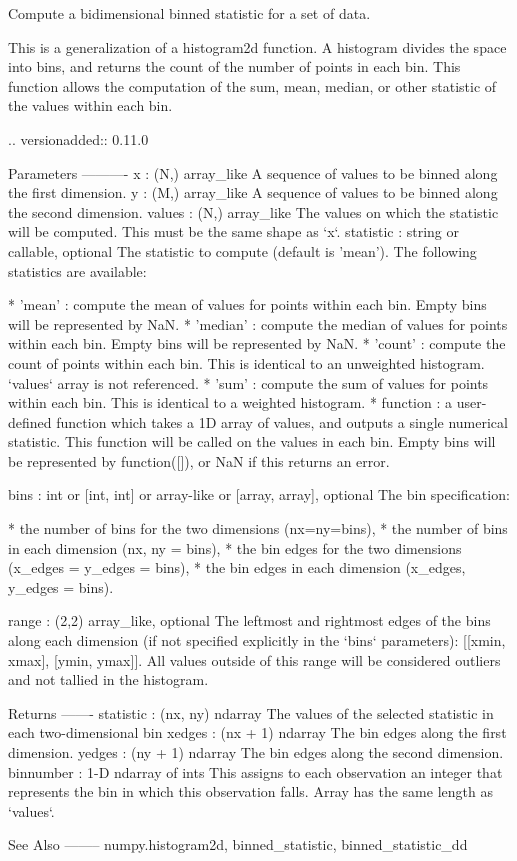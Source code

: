 \begin{DoxyVerb}Compute a bidimensional binned statistic for a set of data.

This is a generalization of a histogram2d function.  A histogram divides
the space into bins, and returns the count of the number of points in
each bin.  This function allows the computation of the sum, mean, median,
or other statistic of the values within each bin.

.. versionadded:: 0.11.0

Parameters
----------
x : (N,) array_like
    A sequence of values to be binned along the first dimension.
y : (M,) array_like
    A sequence of values to be binned along the second dimension.
values : (N,) array_like
    The values on which the statistic will be computed.  This must be
    the same shape as `x`.
statistic : string or callable, optional
    The statistic to compute (default is 'mean').
    The following statistics are available:

      * 'mean' : compute the mean of values for points within each bin.
        Empty bins will be represented by NaN.
      * 'median' : compute the median of values for points within each
        bin. Empty bins will be represented by NaN.
      * 'count' : compute the count of points within each bin.  This is
        identical to an unweighted histogram.  `values` array is not
        referenced.
      * 'sum' : compute the sum of values for points within each bin.
        This is identical to a weighted histogram.
      * function : a user-defined function which takes a 1D array of
        values, and outputs a single numerical statistic. This function
        will be called on the values in each bin.  Empty bins will be
        represented by function([]), or NaN if this returns an error.

bins : int or [int, int] or array-like or [array, array], optional
    The bin specification:

      * the number of bins for the two dimensions (nx=ny=bins),
      * the number of bins in each dimension (nx, ny = bins),
      * the bin edges for the two dimensions (x_edges = y_edges = bins),
      * the bin edges in each dimension (x_edges, y_edges = bins).

range : (2,2) array_like, optional
    The leftmost and rightmost edges of the bins along each dimension
    (if not specified explicitly in the `bins` parameters):
    [[xmin, xmax], [ymin, ymax]]. All values outside of this range will be
    considered outliers and not tallied in the histogram.

Returns
-------
statistic : (nx, ny) ndarray
    The values of the selected statistic in each two-dimensional bin
xedges : (nx + 1) ndarray
    The bin edges along the first dimension.
yedges : (ny + 1) ndarray
    The bin edges along the second dimension.
binnumber : 1-D ndarray of ints
    This assigns to each observation an integer that represents the bin
    in which this observation falls. Array has the same length as `values`.

See Also
--------
numpy.histogram2d, binned_statistic, binned_statistic_dd\end{DoxyVerb}
